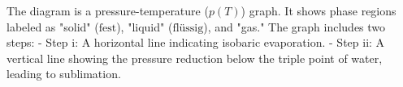 The diagram is a pressure-temperature (\( p(T) \)) graph. It shows phase regions labeled as "solid" (\( \text{fest} \)), "liquid" (\( \text{flüssig} \)), and "gas." The graph includes two steps:  
- Step i: A horizontal line indicating isobaric evaporation.  
- Step ii: A vertical line showing the pressure reduction below the triple point of water, leading to sublimation.